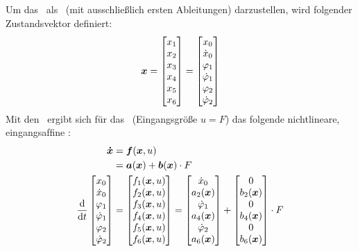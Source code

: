 \subsection{\zrm}

Um das \spds\ als \zrm\ (mit ausschließlich ersten Ableitungen) darzustellen, wird folgender Zustandsvektor definiert:
\begin{align}
	\boldsymbol{x} = \begin{bmatrix}
		x_1 \\	x_2 \\	x_3 \\	x_4 \\	x_5 \\	x_6 \\	
	\end{bmatrix} = \begin{bmatrix}
		x_0 \\ \dot{x}_0 \\ \varphi_1 \\ \dot{\varphi}_1 \\ \varphi_2 \\ \dot{\varphi}_2
	\end{bmatrix}
	\label{eq:vex}
\end{align}
Mit den \bwgl\ ergibt sich für das \krs\ (Eingangsgröße $u=F$) das folgende nichtlineare, eingangsafﬁne \zrm:
\begin{align}
	\vexp &= \ve{f}(\vex,u)  \\
		&= \ve{a}(\vex) + \ve{b}(\vex) \cdot F  
		\label{eq:zrm} 
		\\\vspace{100cm}
	\ddt \begin{bmatrix}
		\xo \\ \xop \\ \phe \\ \phep \\ \phz \\ \phzp
	\end{bmatrix} &= \begin{bmatrix}
		f_1(\vex,u) \\ f_2(\vex,u) \\  f_3(\vex,u) \\  f_4(\vex,u) \\  f_5(\vex,u) \\  f_6(\vex,u)
	\end{bmatrix}= \begin{bmatrix}
		\xop \\ a_2(\vex) \\ \phep \\  a_4(\vex) \\ \phzp \\  a_6(\vex)
	\end{bmatrix} + \begin{bmatrix}
		0 \\ b_2(\vex) \\ 0 \\  b_4(\vex) \\ 0 \\  b_6(\vex)
	\end{bmatrix} \cdot F
	\label{eq:zrmF}
\end{align}

